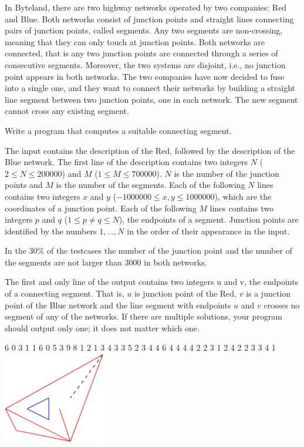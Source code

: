 





In Byteland, there are two highway networks operated by two companies: Red and Blue. Both networks consist of junction points and straight lines connecting pairs of junction points, called segments. Any two segments are non-crossing, meaning that they can only touch at junction points. Both networks are connected, that is any two junction points are connected through a series of consecutive segments. Moreover, the two systems are disjoint, i.e., no junction point appears in both networks.
The two companies have now decided to fuse into a single one, and they want to connect their networks by building a straight line segment between two junction points, one in each network. The new segment cannot cross any existing segment.

Write a program that computes a suitable connecting segment.

The input contains the description of the Red, followed by the description of the Blue network. The first line of the description contains two integers $N$ ($2 \leq N \leq 200000$) and $M$ ($1 \leq M \leq 700000$). $N$ is the number of the junction points and $M$ is the number of the segments. Each of the following $N$ lines contains two integers $x$ and $y$ ($-1000000 \leq x,y \leq 1000000$), which are the coordinates of a junction point. Each of the following $M$ lines contains two integers $p$ and $q$ ($1\leq p \neq q \leq N$), the endpoints of a segment. Junction points are identified by the numbers $1,\ldots,N$ in the order of their appearance in the input.

\bigskip
In the $30\%$ of the testcases the number of the junction point and the number of the segments are not larger than $3 000$ in both networks.

The first and only line of the output contains two integers u and v, the endpoints of a connecting segment. That is, $u$ is junction point of the Red, $v$ is a junction point of the Blue network and the line segment with endpoints $u$ and $v$ crosses no segment of any of the networks. If there are multiple solutions, your program should output only one; it does not matter which one.


 6
0 3
1 1
6 0
5 3
9 8
1 2
1 3
4 3
3 5
2 3
4 4
6 4
4 4
4 2
2 3
1 2
4 2
2 3
3 4
 1
\sampleCOMMENT
\includegraphics[height=4cm]{img/fig11.pdf}
\sampleEND


